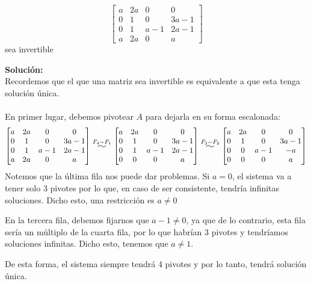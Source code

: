 \documentclass[12pt]{article}
\newenvironment{solucion}
{\begin{mdframed}[backgroundcolor=black!10]
		{\bf Solución:}\\
	}
	{
	\end{mdframed}
}
\newenvironment{preguntas}
{\begin{enumerate}\itemsep12pt
	}
	{
	\end{enumerate}
}
\newcommand{\widesim}[2][1.5]{
	\mathrel{\overset{#2}{\scalebox{#1}[1]{$\sim$}}}
}
\begin{document}
\begin{preguntas}
$$\begin{bmatrix}
	a & 2a & 0 & 0 \\
	0 & 1 & 0 & 3a-1\\
	0 & 1 & a-1 & 2a-1\\
	a & 2a & 0 & a
	\end{bmatrix}$$
	sea invertible
\begin{solucion}
Recordemos que el que una matriz sea invertible es equivalente a que esta tenga solución única.\\\\En primer lugar, debemos pivotear $A$ para dejarla en su forma escalonada:
		$$\begin{bmatrix}
		a & 2a & 0 & 0 \\
		0 & 1 & 0 & 3a-1\\
		0 & 1 & a-1 & 2a-1\\
		a & 2a & 0 & a
		\end{bmatrix} \widesim{F_4-F_1}
		\begin{bmatrix}
		a & 2a & 0 & 0 \\
		0 & 1 & 0 & 3a-1\\
		0 & 1 & a-1 & 2a-1\\
		0 & 0 & 0 & a
		\end{bmatrix} \widesim{F_3-F_2}
		\begin{bmatrix}
		a & 2a & 0 & 0 \\
		0 & 1 & 0 & 3a-1\\
		0 & 0 & a-1 & -a\\
		0 & 0 & 0 & a
		\end{bmatrix}$$
		Notemos que la última fila nos puede dar problemas. Si $a=0$, el sistema va a tener solo 3 pivotes por lo que, en caso de ser consistente, tendría infinitas soluciones. Dicho esto, una restricción es $a\neq 0$
		
		En la tercera fila, debemos fijarnos que $a-1 \neq 0$, ya que de lo contrario, esta fila sería un múltiplo de la cuarta fila, por lo que habrían 3 pivotes y tendríamos soluciones infinitas. Dicho esto, tenemos que $a \neq 1$.
		
		De esta forma, el sistema siempre tendrá 4 pivotes y por lo tanto, tendrá solución única.
		

\end{solucion}
\end{preguntas}
\end{document}

